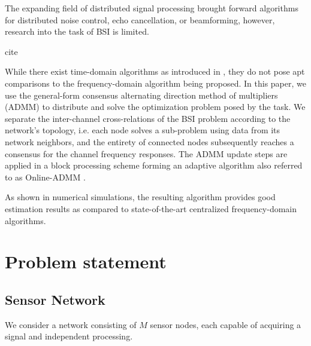 \documentclass{article}
\begin{document}
The expanding field of distributed signal processing brought forward algorithms for distributed noise control, echo cancellation, or beamforming, however, research into the task of BSI is limited.
\begin{attention}
    cite
\end{attention}
While there exist time-domain algorithms as introduced in \cite{yuDistributedBlindSystem2014,liuDistributedBlindIdentification2016,liuDistributedRecursiveBlind2017}, they do not pose apt comparisons to the frequency-domain algorithm being proposed.
In this paper, we use the general-form consensus alternating direction method of multipliers (ADMM) \cite{boydDistributedOptimizationStatistical2011} to distribute and solve the optimization problem posed by the task.
We separate the inter-channel cross-relations of the BSI problem according to the network's topology, i.e. each node solves a sub-problem using data from its network neighbors, and the entirety of connected nodes subsequently reaches a consensus for the channel frequency responses.
The ADMM update steps are applied in a block processing scheme forming an adaptive algorithm also referred to as Online-ADMM \cite{wangOnlineAlternatingDirection2013,hosseiniOnlineDistributedADMM2014}.

As shown in numerical simulations, the resulting algorithm provides good estimation results as compared to state-of-the-art centralized frequency-domain algorithms.

\section{Problem statement}
\label{sec:problem_statement}

\subsection{Sensor Network}
\label{ssec:sensor_network}
We consider a network consisting of \(M\) sensor nodes, each capable of acquiring a signal and independent processing.


\end{document}
